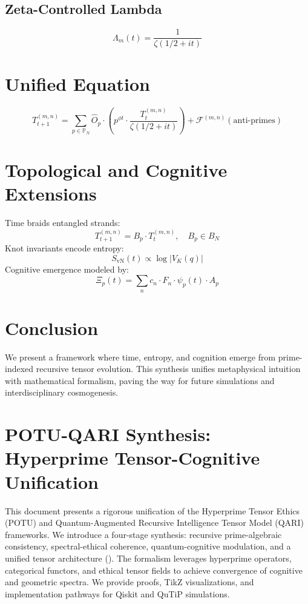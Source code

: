 \documentclass[12pt]{article}
\newcommand{\UQT}{\text{UQT}}
\begin{document}
\subsection{Zeta-Controlled Lambda}
\[
\Lambda_m(t) = \frac{1}{\zeta(1/2 + it)}
\]

\section{Unified Equation}
\[
\boxed{
T_{t+1}^{(m,n)} = \sum_{p \in \mathbb{P}_N} \hat{O}_p \cdot \left( p^{\phi t} \cdot \frac{T_t^{(m,n)}}{\zeta(1/2 + it)} \right) + \mathcal{F}^{(m,n)}( \text{anti-primes} )
}
\]

\section{Topological and Cognitive Extensions}
Time braids entangled strands:
\[
T_{t+1}^{(m,n)} = B_p \cdot T_t^{(m,n)}, \quad B_p \in B_N
\]
Knot invariants encode entropy:
\[
S_{\text{vN}}(t) \propto \log |V_K(q)|
\]
Cognitive emergence modeled by:
\[
\Xi_p(t) = \sum_{n} c_n \cdot F_n \cdot \psi_p(t) \cdot A_p
\]

\section{Conclusion}
We present a framework where time, entropy, and cognition emerge from prime-indexed recursive tensor evolution. This synthesis unifies metaphysical intuition with mathematical formalism, paving the way for future simulations and interdisciplinary cosmogenesis.



\section{\textbf{POTU-QARI Synthesis: Hyperprime Tensor-Cognitive Unification}}

This document presents a rigorous unification of the Hyperprime Tensor Ethics (POTU) and Quantum-Augmented Recursive Intelligence Tensor Model (QARI) frameworks. We introduce a four-stage synthesis: recursive prime-algebraic consistency, spectral-ethical coherence, quantum-cognitive modulation, and a unified tensor architecture (\UQT). The formalism leverages hyperprime operators, categorical functors, and ethical tensor fields to achieve convergence of cognitive and geometric spectra. We provide proofs, TikZ visualizations, and implementation pathways for Qiskit and QuTiP simulations.
\end{document}
